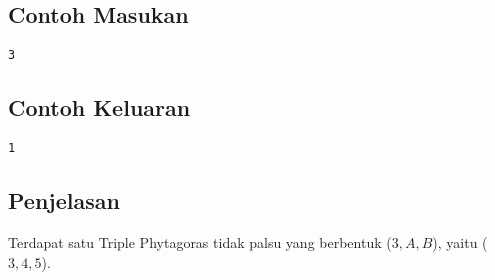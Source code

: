 \documentclass{article}
\begin{document}
\begin{multicols}{2}
\subsection*{Contoh Masukan}
\begin{lstlisting}
3

\end{lstlisting}
\columnbreak
\subsection*{Contoh Keluaran}
\begin{lstlisting}
1
\end{lstlisting}
\vfill
\null
\end{multicols}

\subsection*{Penjelasan}
Terdapat satu Triple Phytagoras tidak palsu yang berbentuk ($3, A, B$), yaitu ($3, 4, 5$).

\pagebreak
\end{document}
